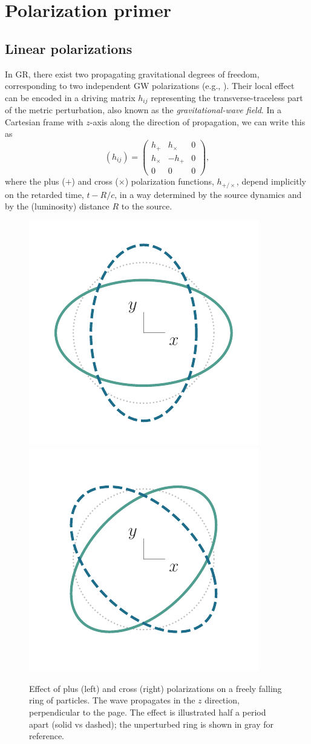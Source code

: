 \documentclass[aps,prd,twocolumn,superscriptaddress,preprintnumbers,floatfix,nofootinbib]{revtex4-2}
\newcommand{\beq}{\begin{equation}}
\newcommand{\eeq}{\end{equation}}
\begin{document}
\section{Polarization primer}

\subsection{Linear polarizations}

In GR, there exist two propagating gravitational degrees of freedom, corresponding to two independent GW polarizations (e.g., \cite{Thorne:1987af}).
Their local effect can be encoded in a driving matrix $h_{ij}$ representing the transverse-traceless part of the metric perturbation, also known as the \emph{gravitational-wave field}.
In a Cartesian frame with $z$-axis along the direction of propagation, we can write this as
\beq \label{eq:hij}
(h_{ij}) = \begin{pmatrix}
h_+ & h_\times  & 0 \\
h_\times  & - h_+ & 0  \\
0 & 0 & 0
\end{pmatrix} ,
\eeq
where the plus ($+$) and cross ($\times$) polarization functions, $h_{+/\times}$, depend implicitly on the retarded time, $t - R/c$, in a way determined by the source dynamics and by the (luminosity) distance $R$ to the source.

\begin{figure}
\includegraphics[width=0.4\columnwidth]{pol_ring_plus}
\includegraphics[width=0.4\columnwidth]{pol_ring_cross}
\caption{Effect of plus (left) and cross (right) polarizations on a freely falling ring of particles. The wave propagates in the $z$ direction, perpendicular to the page. The effect is illustrated half a period apart (solid vs dashed); the unperturbed ring is shown in gray for reference.
}
\label{fig:rings}
\end{figure}
\end{document}
